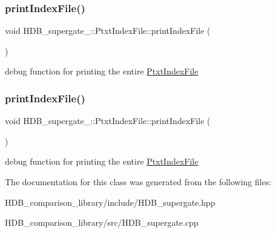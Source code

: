 \subsubsection{\texorpdfstring{print\+Index\+File()}{printIndexFile()}\hspace{0.1cm}{\footnotesize\ttfamily [1/2]}}
{\footnotesize\ttfamily void H\+D\+B\+\_\+supergate\+\_\+\+::\+Ptxt\+Index\+File\+::print\+Index\+File (\begin{DoxyParamCaption}{ }\end{DoxyParamCaption})}

debug function for printing the entire \hyperlink{classHDB__supergate___1_1PtxtIndexFile}{Ptxt\+Index\+File} \mbox{\label{classHDB__supergate___1_1PtxtIndexFile_ae67b7aec347663f4f47841f20788e2e6}} 
\subsubsection{\texorpdfstring{print\+Index\+File()}{printIndexFile()}\hspace{0.1cm}{\footnotesize\ttfamily [2/2]}}
{\footnotesize\ttfamily void H\+D\+B\+\_\+supergate\+\_\+\+::\+Ptxt\+Index\+File\+::print\+Index\+File (\begin{DoxyParamCaption}{ }\end{DoxyParamCaption})}

debug function for printing the entire \hyperlink{classHDB__supergate___1_1PtxtIndexFile}{Ptxt\+Index\+File} 

The documentation for this class was generated from the following files\+:\begin{DoxyCompactItemize}
\item 
H\+D\+B\+\_\+comparison\+\_\+library/include/H\+D\+B\+\_\+supergate.\+hpp\item 
H\+D\+B\+\_\+comparison\+\_\+library/src/H\+D\+B\+\_\+supergate.\+cpp\end{DoxyCompactItemize}
